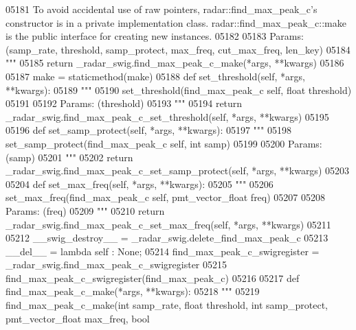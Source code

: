 \begin{DoxyCode}
{{{{{{{{{{{{{{{{{{05181 \textcolor{stringliteral}{        To avoid accidental use of raw pointers, radar::find\_max\_peak\_c's constructor is in a private
       implementation class. radar::find\_max\_peak\_c::make is the public interface for creating new instances.}
05182 \textcolor{stringliteral}{}
05183 \textcolor{stringliteral}{        Params: (samp\_rate, threshold, samp\_protect, max\_freq, cut\_max\_freq, len\_key)}
05184 \textcolor{stringliteral}{        """}
05185         \textcolor{keywordflow}{return} \_radar\_swig.find\_max\_peak\_c\_make(*args, **kwargs)
05186 
05187     make = staticmethod(make)
05188     \textcolor{keyword}{def }set_threshold(self, *args, **kwargs):
05189         \textcolor{stringliteral}{"""}
05190 \textcolor{stringliteral}{        set\_threshold(find\_max\_peak\_c self, float threshold)}
05191 \textcolor{stringliteral}{}
05192 \textcolor{stringliteral}{        Params: (threshold)}
05193 \textcolor{stringliteral}{        """}
05194         \textcolor{keywordflow}{return} \_radar\_swig.find\_max\_peak\_c\_set\_threshold(self, *args, **kwargs)
05195 
05196     \textcolor{keyword}{def }set_samp_protect(self, *args, **kwargs):
05197         \textcolor{stringliteral}{"""}
05198 \textcolor{stringliteral}{        set\_samp\_protect(find\_max\_peak\_c self, int samp)}
05199 \textcolor{stringliteral}{}
05200 \textcolor{stringliteral}{        Params: (samp)}
05201 \textcolor{stringliteral}{        """}
05202         \textcolor{keywordflow}{return} \_radar\_swig.find\_max\_peak\_c\_set\_samp\_protect(self, *args, **kwargs)
05203 
05204     \textcolor{keyword}{def }set_max_freq(self, *args, **kwargs):
05205         \textcolor{stringliteral}{"""}
05206 \textcolor{stringliteral}{        set\_max\_freq(find\_max\_peak\_c self, pmt\_vector\_float freq)}
05207 \textcolor{stringliteral}{}
05208 \textcolor{stringliteral}{        Params: (freq)}
05209 \textcolor{stringliteral}{        """}
05210         \textcolor{keywordflow}{return} \_radar\_swig.find\_max\_peak\_c\_set\_max\_freq(self, *args, **kwargs)
05211 
05212     \_\_swig\_destroy\_\_ = \_radar\_swig.delete\_find\_max\_peak\_c
05213     \_\_del\_\_ = \textcolor{keyword}{lambda} self : \textcolor{keywordtype}{None};
05214 find\_max\_peak\_c\_swigregister = \_radar\_swig.find\_max\_peak\_c\_swigregister
05215 find_max_peak_c_swigregister(find\_max\_peak\_c)
05216 
05217 \textcolor{keyword}{def }find_max_peak_c_make(*args, **kwargs):
05218   \textcolor{stringliteral}{"""}
05219 \textcolor{stringliteral}{    find\_max\_peak\_c\_make(int samp\_rate, float threshold, int samp\_protect, pmt\_vector\_float max\_freq, bool
}}}}}}}}}}}}}}}}}}}
\end{DoxyCode}
